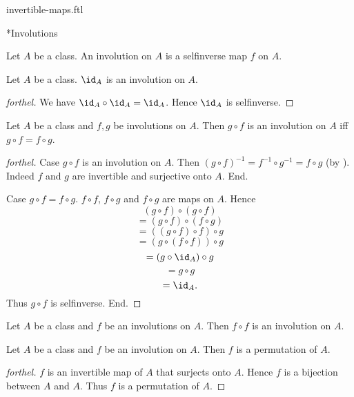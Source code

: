 \documentclass{naproche-library}
\begin{document}
\begin{smodule}[title=Invertible Maps]{invertible-maps.ftl}
\begin{sfragment}*{Involutions}
  \begin{definition}[forthel,id=FOUNDATIONS_09_7282039688527872]
    Let $A$ be a class.
    An involution on $A$ is a selfinverse map $f$ on $A$.
  \end{definition}

  \begin{proposition}[forthel,id=FOUNDATIONS_09_7944474185433088]
    Let $A$ be a class.
    $\id_{A}$ is an involution on $A$.
  \end{proposition}
  \begin{proof}[forthel]
    We have $\id_{A} \circ \id_{A} = \id_{A}$.
    Hence $\id_{A}$ is selfinverse.
  \end{proof}

  \begin{proposition}[forthel,id=FOUNDATIONS_09_6897019612299264]
    Let $A$ be a class and $f, g$ be involutions on $A$.
    Then $g \circ f$ is an involution on $A$ iff $g \circ f = f \circ g$.
  \end{proposition}
  \begin{proof}[forthel]
    Case $g \circ f$ is an involution on $A$.
      Then $(g \circ f)^{-1}
        = f^{-1} \circ g^{-1}
        = f \circ g$
      (by ).
      Indeed $f$ and $g$ are invertible and surjective onto $A$.
    End.

    Case $g \circ f = f \circ g$.
      $f \circ f$, $f \circ g$ and $f \circ g$ are maps on $A$.
      Hence
      \[  (g \circ f) \circ (g \circ f)       \]
      \[    = (g \circ f) \circ (f \circ g)   \]
      \[    = ((g \circ f) \circ f) \circ g   \]
      \[    = (g \circ (f \circ f)) \circ g   \]
      \[    = (g \circ \id_{A}) \circ g       \]
      \[    = g \circ g                       \]
      \[    = \id_{A}.                        \]
      Thus $g \circ f$ is selfinverse.
    End.
  \end{proof}

  \begin{corollary}[forthel,id=FOUNDATIONS_09_5958206868160512]
    Let $A$ be a class and $f$ be an involutions on $A$.
    Then $f \circ f$ is an involution on $A$.
  \end{corollary}

  \begin{proposition}[forthel,id=FOUNDATIONS_09_2314262743613440]
    Let $A$ be a class and $f$ be an involution on $A$.
    Then $f$ is a permutation of $A$.
  \end{proposition}
  \begin{proof}[forthel]
    $f$ is an invertible map of $A$ that surjects onto $A$.
    Hence $f$ is a bijection between $A$ and $A$.
    Thus $f$ is a permutation of $A$.
  \end{proof}
\end{sfragment}
\end{smodule}
\end{document}
